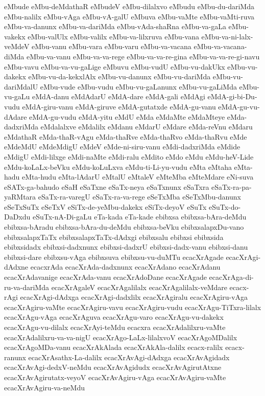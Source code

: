 {eMbude
eMbu-deMdathaR
eMbudeV
eMbu-dilalxvo
eMbudu
eMbu-du-dariMda
eMbu-nalilx
eMbu-vAga
eMbu-vA-galU
eMbuva
eMbu-vaMte
eMbu-vaMti-ruva
eMbu-va-danunx
eMbu-va-dariMda
eMbu-vAda-shaRna
eMbu-va-gaLa
eMbu-vakekx
eMbu-valUlx
eMbu-valilx
eMbu-va-lilxruva
eMbu-vana
eMbu-va-ni-lalx-veMdeV
eMbu-vanu
eMbu-vara
eMbu-varu
eMbu-va-vacana
eMbu-va-vacana-diMda
eMbu-va-vanu
eMbu-va-va-rege
eMbu-va-va-re-gina
eMbu-va-va-re-gi-navu
eMbu-vavu
eMbu-va-vu-gaLige
eMbuvu
eMbu-vudU
eMbu-vu-dakUkx
eMbu-vu-dakekx
eMbu-vu-da-kekxlAlx
eMbu-vu-danunx
eMbu-vu-dariMda
eMbu-vu-dariMdalU
eMbu-vude
eMbu-vudu
eMbu-vu-gaLanunx
eMbu-vu-gaLiMda
eMbu-vu-gaLu
eMdA-danu
eMdAdarU
eMdA-dare
eMdA-gali
eMdAgi
eMdA-gi-bi-Du-vudu
eMdA-giru-vanu
eMdA-giruve
eMdA-gutatxde
eMdA-gu-vanu
eMdA-gu-vu-dAdare
eMdA-gu-vudu
eMdA-yitu
eMdU
eMda
eMdaMte
eMdaMteye
eMda-dadxriMda
eMdalalxve
eMdalilx
eMdanu
eMdarU
eMdare
eMda-reVnu
eMdaru
eMdathaR
eMda-thaR-vAgu
eMda-thaRve
eMda-thaRvo
eMda-thaRvu
eMde
eMdeMdU
eMdeMdigU
eMdeV
eMde-ni-siru-vanu
eMdi-dadxriMda
eMdide
eMdigU
eMdi-lilxge
eMdi-naMte
eMdi-ralu
eMdito
eMdo
eMdu
eMdu-heV-Lide
eMdu-koLaLx-beVku
eMdu-koLuLxva
eMdu-ti-Li-yu-vudu
eMta
eMtaha
eMta-hadu
eMta-hudu
eMta-lAdarU
eMtalU
eMtaleV
eMteMba
eMteMdare
eNi-suva
eSATx-ga-bahudo
eSaH
eSaTxne
eSaTx-neya
eSaTxnunx
eSaTxra
eSaTx-ra-pa-yaRMtara
eSaTx-ra-varegU
eSaTx-ra-va-rege
eSeTxMba
eSeTxMbu-danunx
eSeTxSuTx
eSeTxV
eSiTx-de-yeMbu-dakekx
eSiTx-deyoV
eSuTx
eSuTx-do-DaDxdu
eSuTx-nA-Di-gaLu
eTa-kada
eTa-kade
ebibxsa
ebibxsa-bAra-deMdu
ebibxsa-bAradu
ebibxsa-bAra-du-deMdu
ebibxsa-beVku
ebibxsalapxDu-vano
ebibxsalapxTaTx
ebibxsalapxTaTx-dAdxgi
ebibxsalu
ebibxsi
ebibxsida
ebibxsidadx
ebibxsi-dadxnunx
ebibxsi-dadxrU
ebibxsi-dadx-vanu
ebibxsi-danu
ebibxsi-dare
ebibxsu-vAga
ebibxsuva
ebibxsu-vu-duMTu
ecacXrAgade
ecacXrAgi-dAdxne
ecacxrAda
ecacXrAda-dadxnunx
ecacXrAdano
ecacXrAdanu
ecacXrAdavanige
ecacXrAda-vanu
ecacXrAdoDane
ecacXrAgade
ecacXrAga-di-ru-va-dariMda
ecacXrAgaleV
ecacXrAgalilalx
ecacXrAgalilalx-veMdare
ecacx-rAgi
ecacXrAgi-dAdxga
ecacXrAgi-dadxlilx
ecacXrAgiralu
ecacXrAgiru-vAga
ecacXrAgiru-vaMte
ecacXrAgiru-vavu
ecacXrAgiru-vudu
ecacXrAgu-TiTxra-lilalx
ecacXrAgu-vAga
ecacXrAguva
ecacXrAgu-varo
ecacXrAgu-vu-dakekx
ecacXrAgu-vu-dilalx
ecacXrAyi-teMdu
ecacxra
ecacXrAdalilxru-vaMte
ecacXrAdalilxru-va-va-nigU
ecacXrAgo-LaLx-lilalxvoV
ecacXrAgoMDalilx
ecacXrAgoMDa-vanu
ecacXrAkAlada
ecacXrAkAla-dalilx
ecacx-ralilx
ecacx-ranunx
ecacXrAsathx-La-dalilx
ecacXrAvAgi-dAdxga
ecacXrAvAgidadx
ecacXrAvAgi-dedxV-neMdu
ecacXrAvAgidudx
ecacXrAvAgirutAtxne
ecacXrAvAgirutatx-veyoV
ecacXrAvAgiru-vAga
ecacXrAvAgiru-vaMte
ecacXrAvAgiru-va-neMdu
}
